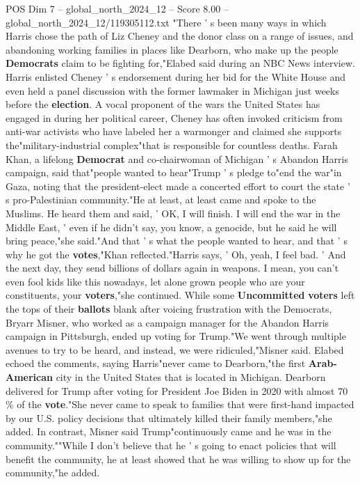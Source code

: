 \begin{textsample}{POS Dim 7 – global\_north\_2024\_12 – Score 8.00 – global\_north\_2024\_12/119305112.txt}  \label{ex:f7_pos_288}
"There ' s been many ways in which Harris chose the path of Liz Cheney and the donor class on a range of issues, and abandoning working families in places like Dearborn, who make up the people \textbf{Democrats} claim to be fighting for,"Elabed said during an NBC News interview.
Harris enlisted Cheney ' s endorsement during her bid for the White House and even held a panel discussion with the former lawmaker in Michigan just weeks before the \textbf{election}.
A vocal proponent of the wars the United States has engaged in during her political career, Cheney has often invoked criticism from anti-war activists who have labeled her a warmonger and claimed she supports the"military-industrial complex"that is responsible for countless deaths.
Farah Khan, a lifelong \textbf{Democrat} and co-chairwoman of Michigan ' s Abandon Harris campaign, said that"people wanted to hear"Trump ' s pledge to"end the war"in Gaza, noting that the president-elect made a concerted effort to court the state ' s pro-Palestinian community."He at least, at least came and spoke to the Muslims.
He heard them and said, ' OK, I will finish.
I will end the war in the Middle East, ' even if he didn't say, you know, a genocide, but he said he will bring peace,"she said."And that ' s what the people wanted to hear, and that ' s why he got the \textbf{votes},"Khan reflected."Harris says, ' Oh, yeah, I feel bad. ' And the next day, they send billions of dollars again in weapons.
I mean, you can't even fool kids like this nowadays, let alone grown people who are your constituents, your \textbf{voters},"she continued.
While some \textbf{Uncommitted} \textbf{voters} left the tops of their \textbf{ballots} blank after voicing frustration with the Democrats, Bryarr Misner, who worked as a campaign manager for the Abandon Harris campaign in Pittsburgh, ended up voting for Trump."We went through multiple avenues to try to be heard, and instead, we were ridiculed,"Misner said.
Elabed echoed the comments, saying Harris"never came to Dearborn,"the first \textbf{Arab-American} city in the United States that is located in Michigan.
Dearborn delivered for Trump after voting for President Joe Biden in 2020 with almost 70 \% of the \textbf{vote}."She never came to speak to families that were first-hand impacted by our U.S. policy decisions that ultimately killed their family members,"she added.
In contrast, Misner said Trump"continuously came and he was in the community.""While I don't believe that he ' s going to enact policies that will benefit the community, he at least showed that he was willing to show up for the community,"he added.

\end{textsample}
